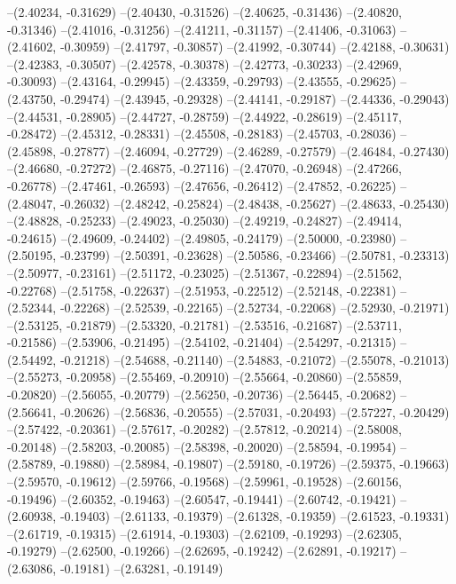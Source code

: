 --(2.40234, -0.31629)
--(2.40430, -0.31526)
--(2.40625, -0.31436)
--(2.40820, -0.31346)
--(2.41016, -0.31256)
--(2.41211, -0.31157)
--(2.41406, -0.31063)
--(2.41602, -0.30959)
--(2.41797, -0.30857)
--(2.41992, -0.30744)
--(2.42188, -0.30631)
--(2.42383, -0.30507)
--(2.42578, -0.30378)
--(2.42773, -0.30233)
--(2.42969, -0.30093)
--(2.43164, -0.29945)
--(2.43359, -0.29793)
--(2.43555, -0.29625)
--(2.43750, -0.29474)
--(2.43945, -0.29328)
--(2.44141, -0.29187)
--(2.44336, -0.29043)
--(2.44531, -0.28905)
--(2.44727, -0.28759)
--(2.44922, -0.28619)
--(2.45117, -0.28472)
--(2.45312, -0.28331)
--(2.45508, -0.28183)
--(2.45703, -0.28036)
--(2.45898, -0.27877)
--(2.46094, -0.27729)
--(2.46289, -0.27579)
--(2.46484, -0.27430)
--(2.46680, -0.27272)
--(2.46875, -0.27116)
--(2.47070, -0.26948)
--(2.47266, -0.26778)
--(2.47461, -0.26593)
--(2.47656, -0.26412)
--(2.47852, -0.26225)
--(2.48047, -0.26032)
--(2.48242, -0.25824)
--(2.48438, -0.25627)
--(2.48633, -0.25430)
--(2.48828, -0.25233)
--(2.49023, -0.25030)
--(2.49219, -0.24827)
--(2.49414, -0.24615)
--(2.49609, -0.24402)
--(2.49805, -0.24179)
--(2.50000, -0.23980)
--(2.50195, -0.23799)
--(2.50391, -0.23628)
--(2.50586, -0.23466)
--(2.50781, -0.23313)
--(2.50977, -0.23161)
--(2.51172, -0.23025)
--(2.51367, -0.22894)
--(2.51562, -0.22768)
--(2.51758, -0.22637)
--(2.51953, -0.22512)
--(2.52148, -0.22381)
--(2.52344, -0.22268)
--(2.52539, -0.22165)
--(2.52734, -0.22068)
--(2.52930, -0.21971)
--(2.53125, -0.21879)
--(2.53320, -0.21781)
--(2.53516, -0.21687)
--(2.53711, -0.21586)
--(2.53906, -0.21495)
--(2.54102, -0.21404)
--(2.54297, -0.21315)
--(2.54492, -0.21218)
--(2.54688, -0.21140)
--(2.54883, -0.21072)
--(2.55078, -0.21013)
--(2.55273, -0.20958)
--(2.55469, -0.20910)
--(2.55664, -0.20860)
--(2.55859, -0.20820)
--(2.56055, -0.20779)
--(2.56250, -0.20736)
--(2.56445, -0.20682)
--(2.56641, -0.20626)
--(2.56836, -0.20555)
--(2.57031, -0.20493)
--(2.57227, -0.20429)
--(2.57422, -0.20361)
--(2.57617, -0.20282)
--(2.57812, -0.20214)
--(2.58008, -0.20148)
--(2.58203, -0.20085)
--(2.58398, -0.20020)
--(2.58594, -0.19954)
--(2.58789, -0.19880)
--(2.58984, -0.19807)
--(2.59180, -0.19726)
--(2.59375, -0.19663)
--(2.59570, -0.19612)
--(2.59766, -0.19568)
--(2.59961, -0.19528)
--(2.60156, -0.19496)
--(2.60352, -0.19463)
--(2.60547, -0.19441)
--(2.60742, -0.19421)
--(2.60938, -0.19403)
--(2.61133, -0.19379)
--(2.61328, -0.19359)
--(2.61523, -0.19331)
--(2.61719, -0.19315)
--(2.61914, -0.19303)
--(2.62109, -0.19293)
--(2.62305, -0.19279)
--(2.62500, -0.19266)
--(2.62695, -0.19242)
--(2.62891, -0.19217)
--(2.63086, -0.19181)
--(2.63281, -0.19149)
